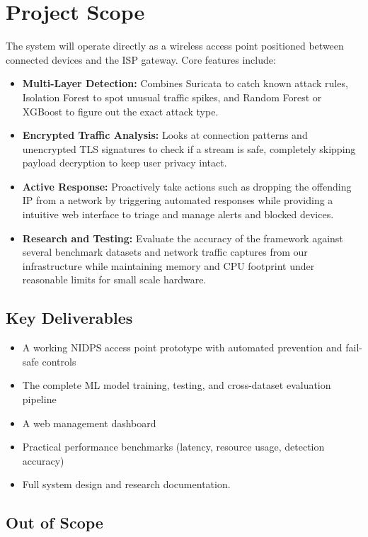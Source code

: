 \section{Project Scope}\label{sec:2.5}

\noindent The system will operate directly as a wireless access point positioned between connected devices and the ISP gateway. Core features include:

\begin{itemize}
\item \textbf{Multi-Layer Detection:} Combines Suricata to catch known attack rules, Isolation Forest to spot unusual traffic spikes, and Random Forest or XGBoost to figure out the exact attack type.
\item \textbf{Encrypted Traffic Analysis:} Looks at connection patterns and unencrypted TLS signatures to check if a stream is safe, completely skipping payload decryption to keep user privacy intact.
\item \textbf{Active Response:} Proactively take actions such as dropping the offending IP from a network by triggering automated responses while providing a intuitive web interface to triage and manage alerts and blocked devices.
\item \textbf{Research and Testing:} Evaluate the accuracy of the framework against several benchmark datasets and network traffic captures from our infrastructure while maintaining memory and CPU footprint under reasonable limits for small scale hardware.
\end{itemize}

\subsection*{Key Deliverables} 

\begin{itemize}
\item A working NIDPS access point prototype with automated prevention and fail-safe controls
\item The complete ML model training, testing, and cross-dataset evaluation pipeline
\item A web management dashboard
\item Practical performance benchmarks (latency, resource usage, detection accuracy)
\item Full system design and research documentation.
\end{itemize}

\subsection*{Out of Scope}

